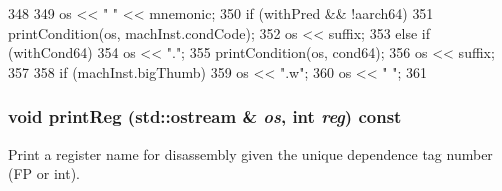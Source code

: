 \begin{DoxyCode}
348 {
349     os << "  " << mnemonic;
350     if (withPred && !aarch64) {
351         printCondition(os, machInst.condCode);
352         os << suffix;
353     } else if (withCond64) {
354         os << ".";
355         printCondition(os, cond64);
356         os << suffix;
357     }
358     if (machInst.bigThumb)
359         os << ".w";
360     os << "   ";
361 }
\end{DoxyCode}
\hypertarget{classArmISA_1_1ArmStaticInst_a48f52fc281b71e29aa8733caf36546fa}{
\subsubsection[{printReg}]{\setlength{\rightskip}{0pt plus 5cm}void printReg (std::ostream \& {\em os}, \/  int {\em reg}) const}}
\label{classArmISA_1_1ArmStaticInst_a48f52fc281b71e29aa8733caf36546fa}
Print a register name for disassembly given the unique dependence tag number (FP or int). 


